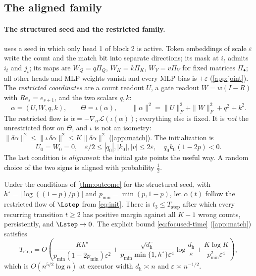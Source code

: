 \subsection{The aligned family}
\paragraph{The structured seed and the restricted family.}\label{sec:seed}
 uses a seed in which only head 1 of block 2 is active. Token embeddings of scale $\varepsilon$ write the count and the match bit into separate directions; its mask at $i_t$ admits $i_t$ and $j_t$; its maps are $W_Q=q\Pi_Q$, $W_K=k\Pi_K$, $W_V=v\Pi_V$ for fixed matrices $\Pi_\bullet$; all other heads and MLP weights vanish and every MLP bias is $\pm\varepsilon$ (\cref{app:joint}). The \emph{restricted coordinates} are a count readout $U$, a gate readout $W=w(I-R)$ with $Re_s=e_{s+1}$, and the two scalars $q,k$:
\begin{equation}\label{eq:metric}
\alpha=(U,W,q,k),\qquad \Theta=\iota(\alpha),\qquad \|\alpha\|^2=\|U\|_F^2+\|W\|_F^2+q^2+k^2.
\end{equation}
The restricted flow is $\dot\alpha=-\nabla_\alpha\mathcal L(\iota(\alpha))$; everything else is fixed. It is \emph{not} the unrestricted flow on $\Theta$, and $\iota$ is not an isometry: $\|\delta\alpha\|^2\le\|\iota\,\delta\alpha\|^2\le K\|\delta\alpha\|^2$ (\cref{app:match}). The initialization is
\begin{equation}\label{eq:init}
U_0=W_0=0,\quad \varepsilon/2\le|q_0|,|k_0|,|v|\le2\varepsilon,
\quad q_0k_0(1-2p)<0.
\end{equation}
The last condition is \emph{alignment}: the initial gate points the useful way. A random choice of the two signs is aligned with probability $\frac12$.

\begin{theorem}\label{thm:step}
Under the conditions of \cref{thm:outcome} for the structured seed, with $h^\star=|\log((1-p)/p)|$ and $p_{\min}=\min(p,1-p)$, let $\alpha(t)$ follow the restricted flow of $\Lstep$ from \cref{eq:init}. There is $t_3\le T_{\mathrm{step}}$ after which every recurring transition $t\ge2$ has positive margin against all $K-1$ wrong counts, persistently, and $\Lstep\to0$. The explicit bound \cref{eq:focused-time} (\cref{app:match}) satisfies
\[
T_{\mathrm{step}}=O\!\left(\frac{Kh^\star}{p_{\min}(1-2p_{\min})\varepsilon^2}+\frac{\sqrt{d_{\mathrm h}}}{p_{\min}\min\{1,h^\star\}\varepsilon^4}\log\frac{d_{\mathrm h}}{\varepsilon}+\frac{K\log K}{p_{\min}^2\varepsilon^4}\right),
\]
which is $O(n^{5/2}\log n)$ at executor width $d_{\mathrm h}\asymp n$ and $\varepsilon\asymp n^{-1/2}$.
\end{theorem}

